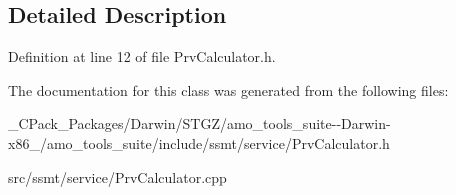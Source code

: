 \subsection{Detailed Description}


Definition at line 12 of file Prv\+Calculator.\+h.



The documentation for this class was generated from the following files\+:\begin{DoxyCompactItemize}
\item 
\+\_\+\+C\+Pack\+\_\+\+Packages/\+Darwin/\+S\+T\+G\+Z/amo\+\_\+tools\+\_\+suite-\/-\/\+Darwin-\/x86\+\_/amo\+\_\+tools\+\_\+suite/include/ssmt/service/Prv\+Calculator.\+h\item 
src/ssmt/service/Prv\+Calculator.\+cpp\end{DoxyCompactItemize}
